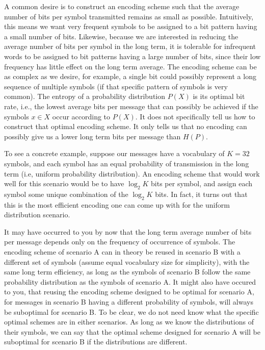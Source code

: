 \documentclass[a4paper]{article}
\begin{document}
A common desire is to construct an encoding scheme such that
the average number of bits per symbol transmitted remains as
small as possible. Intuitively, this means we want very
frequent symbols to be assigned to a bit pattern having a
small number of bits. Likewise, because we are interested in
reducing the average number of bits per symbol in the long
term, it is tolerable for infrequent words to be assigned to
bit patterns having a large number of bits, since their low
frequency has little effect on the long term average. The
encoding scheme can be as complex as we desire, for example,
a single bit could possibly represent a long sequence of
multiple symbols (if that specific pattern of symbols is very
common). The entropy of a probability distribution $P(X)$ is
its optimal bit rate, i.e., the lowest average bits per
message that can possibly be achieved if the symbols $x \in X$
occur according to $P(X)$. It does not specifically tell us
how to construct that optimal encoding scheme. It only tells
us that no encoding can possibly give us a lower long term
bits per message than $H(P)$.

To see a concrete example, suppose our messages have a
vocabulary of $K = 32$ symbols, and each symbol has an equal
probability of transmission in the long term (i.e, uniform
probability distribution). An encoding scheme that would
work well for this scenario would be to have $\log_2 K$ bits
per symbol, and assign each symbol some unique combination
of the $\log_2 K$ bits. In fact, it turns out that this is the
most efficient encoding one can come up with for the uniform
distribution scenario.

It may have occurred to you by now that the long term average
number of bits per message depends only on the frequency of
occurrence of symbols. The encoding scheme of scenario A can
in theory be reused in scenario B with a different set of
symbols (assume equal vocabulary size for simplicity),
with the same long term efficiency, as long as the symbols
of scenario B follow the same probability distribution as the
symbols of scenario A. It might also have occured to you,
that reusing the encoding scheme designed to be optimal for
scenario A, for messages in scenario B having a different
probability of symbols, will always be suboptimal for
scenario B. To be clear, we do not need know what the
specific optimal schemes are in either scenarios. As long
as we know the distributions of their symbols, we can say
that the optimal scheme designed for scenario A will be
suboptimal for scenario B if the distributions are different.
\end{document}
